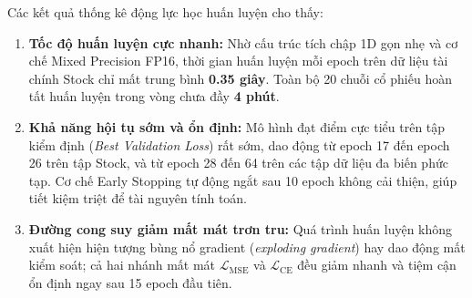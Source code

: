 \documentclass[sigconf,nonacm]{acmart}
\begin{document}
\begin{table}[t]
\centering
\caption{Thống kê thời gian huấn luyện, số epoch hội tụ và tài nguyên tính toán trên Kaggle GPU Nvidia Tesla P100}
\label{tab:training_stats}
\footnotesize
{}
\end{table}

Các kết quả thống kê động lực học huấn luyện cho thấy:
\begin{enumerate}[leftmargin=*, itemsep=2pt, parsep=0pt]
    \item \textbf{Tốc độ huấn luyện cực nhanh:} Nhờ cấu trúc tích chập 1D gọn nhẹ và cơ chế Mixed Precision FP16, thời gian huấn luyện mỗi epoch trên dữ liệu tài chính Stock chỉ mất trung bình \textbf{0.35 giây}. Toàn bộ 20 chuỗi cổ phiếu hoàn tất huấn luyện trong vòng chưa đầy \textbf{4 phút}.
    \item \textbf{Khả năng hội tụ sớm và ổn định:} Mô hình đạt điểm cực tiểu trên tập kiểm định (\textit{Best Validation Loss}) rất sớm, dao động từ epoch 17 đến epoch 26 trên tập Stock, và từ epoch 28 đến 64 trên các tập dữ liệu đa biến phức tạp. Cơ chế Early Stopping tự động ngắt sau 10 epoch không cải thiện, giúp tiết kiệm triệt để tài nguyên tính toán.
    \item \textbf{Đường cong suy giảm mất mát trơn tru:} Quá trình huấn luyện không xuất hiện hiện tượng bùng nổ gradient (\textit{exploding gradient}) hay dao động mất kiểm soát; cả hai nhánh mất mát $\mathcal{L}_{\text{MSE}}$ và $\mathcal{L}_{\text{CE}}$ đều giảm nhanh và tiệm cận ổn định ngay sau 15 epoch đầu tiên.
\end{enumerate}
\end{document}
